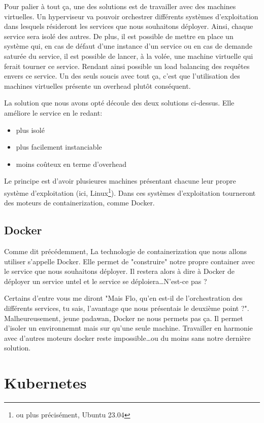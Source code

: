 Pour palier à tout ça, une des solutions est de travailler avec des machines virtuelles. Un hyperviseur va pouvoir orchestrer différents systèmes d'exploitation dans lesquels résideront les services que nous souhaitons déployer. Ainsi, chaque service sera isolé des autres. De plus, il est possible de mettre en place un système qui, en cas de défaut d'une instance d'un service ou en cas de demande saturée du service, il est possible de lancer, à la volée, une machine virtuelle qui ferait tourner ce service. Rendant ainsi possible un load balancing des requêtes envers ce service. Un des seuls soucis avec tout ça, c'est que l'utilisation des machines virtuelles présente un overhead plutôt conséquent.

La solution que nous avons opté découle des deux solutions ci-dessus. Elle améliore le service en le redant:

\begin{itemize}
    \item plus isolé
    \item plus facilement instanciable
    \item moins coûteux en terme d'overhead
\end{itemize}

Le principe est d'avoir plusieures machines présentant chacune leur propre système d'exploitation (ici, Linux\footnote{ou plus précisément, Ubuntu 23.04}). Dans ces systèmes d'exploitation tourneront des moteurs de containerization, comme Docker.

\subsection{Docker}

Comme dit précédemment, La technologie de containerization que nous allons utiliser s'appelle Docker. Elle permet de "construire" notre propre container avec le service que nous souhaitons déployer. Il restera alors à dire à Docker de déployer un service untel et le service se déploiera\dots N'est-ce pas ?

Certains d'entre vous me diront "Mais Flo, qu'en est-il de l'orchestration des différents services, tu sais, l'avantage que nous présentais le deuxième point ?". Malheureusement, jeune padawan, Docker ne nous permets pas ça. Il permet d'isoler un environnemnt mais sur qu'une seule machine. Travailler en harmonie avec d'autres moteurs docker reste impossible\dots ou du moins sans notre dernière solution.

\section{Kubernetes}

